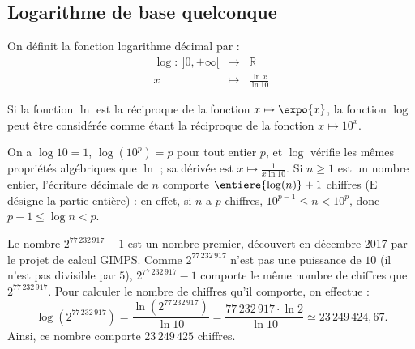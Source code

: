       \subsection{Logarithme de base quelconque}
            \begin{defi}
                  On d\'efinit la fonction logarithme d\'ecimal par :
                        \begin{equation*}
                              \begin{array}{rcl}
                                    \log :\ ]0,+\infty[ & \rightarrow & \mathbb{R}      \\
                                                     x & \mapsto     & \frac{\ln x}{\ln 10}
                              \end{array}
                        \end{equation*}
            \end{defi}
            \begin{prop}
                  Si la fonction $\ln$ est la r\'eciproque de la fonction $x\mapsto \expo{x}$,
                  la fonction $\log$ peut \^etre consid\'er\'ee comme \'etant la r\'eciproque de la fonction $x\mapsto 10^x$.
                  
                  On a $\log 10 = 1$, $\log(10^p) = p$ pour tout entier $p$, et $\log$ v\'erifie les m\^emes propri\'et\'es alg\'ebriques que $\ln$ ;
                  sa d\'eriv\'ee est $x \mapsto \frac{1}{x \ln 10}$.
                  Si $n \geq 1$ est un nombre entier, l'\'ecriture d\'ecimale de $n$ comporte 
                  $\entiere{\log (n)}+1$ chiffres ($\mathrm{E}$ d\'esigne la partie enti\`ere) :
                  en effet, si $n$ a $p$ chiffres, $10^{p-1} \leq n < 10^p$, donc $p - 1 \leq \log n < p$.
                        \begin{ex}
                              Le nombre $2^{77\, 232\, 917} - 1$ est un nombre premier, d\'ecouvert en d\'ecembre 2017 par le projet de calcul GIMPS.
                              Comme $2^{77\, 232\, 917}$ n'est pas une puissance de $10$ (il n'est pas divisible par $5$),
                              $2^{77\, 232\, 917} - 1$ comporte le m\^eme nombre de chiffres que $2^{77\, 232\, 917}$.
                              Pour calculer le nombre de chiffres qu'il comporte, on effectue :
                                    \[
                                           \log (2^{77\, 232\, 917})
                                    =      \frac{\ln (2^{77\, 232\, 917})}{\ln 10} 
                                    =      \frac{77\, 232\, 917 \cdot \ln 2}{\ln 10}
                                    \simeq 23\,249\,424{,}67
                                    .
                                    \]
                              Ainsi, ce nombre comporte $23\,249\,425$ chiffres.
                        \end{ex}
            \end{prop}
